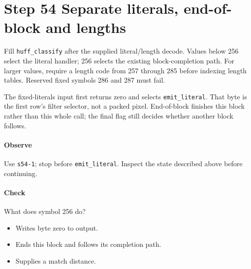 \section{Step 54 Separate literals, end-of-block and lengths}\label{png-huff-s54}
Fill \texttt{huff\_classify} after the supplied literal/length decode. Values below 256 select the literal handler; 256 selects the existing block-completion path. For larger values, require a length code from 257 through 285 before indexing length tables. Reserved fixed symbols 286 and 287 must fail.

The fixed-literals input first returns zero and selects \texttt{emit\_literal}. That byte is the first row's filter selector, not a packed pixel. End-of-block finishes this block rather than this whole call; the final flag still decides whether another block follows.

\paragraph{Observe} Use \texttt{s54-1}; stop before \texttt{emit\_literal}. Inspect the state described above before continuing.

\paragraph{Check} What does symbol 256 do?
\begin{itemize}
  \item[A.] Writes byte zero to output.
  \item[B.] Ends this block and follows its completion path.
  \item[C.] Supplies a match distance.
\end{itemize}

